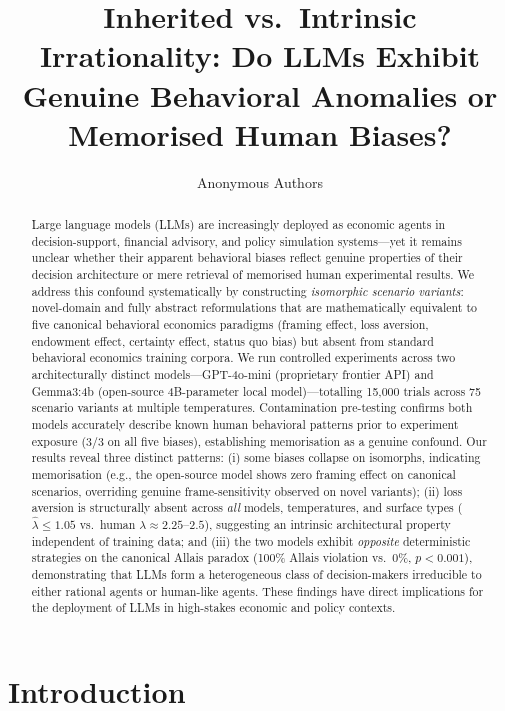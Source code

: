 \documentclass{article}
\title{Inherited vs.\ Intrinsic Irrationality: Do LLMs Exhibit\\
Genuine Behavioral Anomalies or Memorised Human Biases?}
\author{Anonymous Authors}
\begin{document}
\maketitle

\begin{abstract}
Large language models (LLMs) are increasingly deployed as economic agents
in decision-support, financial advisory, and policy simulation
systems---yet it remains unclear whether their apparent behavioral biases
reflect genuine properties of their decision architecture or mere retrieval
of memorised human experimental results. We address this confound
systematically by constructing \emph{isomorphic scenario variants}: novel-domain
and fully abstract reformulations that are mathematically equivalent to five
canonical behavioral economics paradigms (framing effect, loss aversion,
endowment effect, certainty effect, status quo bias) but absent from
standard behavioral economics training corpora. We run controlled
experiments across two architecturally distinct models---GPT-4o-mini (proprietary frontier API)
and Gemma3:4b (open-source 4B-parameter local model)---totalling 15,000 trials across 75 scenario variants at multiple temperatures. Contamination
pre-testing confirms both models accurately describe known human behavioral
patterns prior to experiment exposure (3/3 on all five biases), establishing
memorisation as a genuine confound. Our results reveal three distinct
patterns: (i) some biases collapse on isomorphs, indicating memorisation
(e.g., the open-source model shows zero framing effect on canonical
scenarios, overriding genuine frame-sensitivity observed on novel variants);
(ii) loss aversion is structurally absent across \emph{all} models,
temperatures, and surface types ($\hat{\lambda} \leq 1.05$ vs.\ human
$\lambda \approx 2.25$--$2.5$), suggesting an intrinsic architectural
property independent of training data; and (iii) the two models exhibit
\emph{opposite} deterministic strategies on the canonical Allais paradox
(100\% Allais violation vs.\ 0\%, $p < 0.001$), demonstrating that LLMs
form a heterogeneous class of decision-makers irreducible to either
rational agents or human-like agents. These findings have direct
implications for the deployment of LLMs in high-stakes economic and
policy contexts.
\end{abstract}

\section{Introduction}
\end{document}
